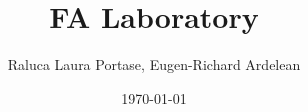 \documentclass{article}
\begin{document}
\title{FA Laboratory}
\author{Raluca Laura Portase, Eugen-Richard Ardelean}
\date{\today}
\maketitle

\tableofcontents
\newpage

\newcommand{\tab}{\hspace*{2em}}
















\newpage
{}
%
%
\end{document}
